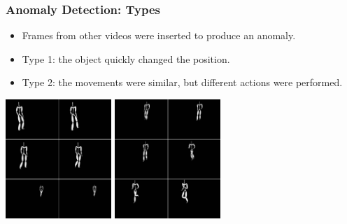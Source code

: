 \documentclass[default]{beamer}
\begin{document}
	\begin{frame}
		\frametitle{Anomaly Detection: Types}
		
		\begin{itemize}
			\item Frames from other videos were inserted to produce an anomaly.
			\item Type 1: the object quickly changed the position.
			\item Type 2: the movements were similar, but different actions were performed.
		\end{itemize}
	
		\centering
		\includegraphics[width=0.3\textwidth]{anom1.jpg}
		\quad
		\includegraphics[width=0.3\textwidth]{anom2.jpg}

	\end{frame}
\end{document}
